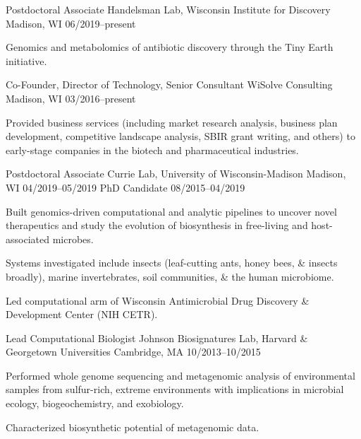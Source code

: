 

\begin{cventries}
  \cventry
    {Postdoctoral Associate} %
    {Handelsman Lab, Wisconsin Institute for Discovery} %
    {Madison, WI} %
    {06/2019--present} %
    {
      \begin{cvitems} %
        \item {Genomics and metabolomics of antibiotic discovery through the Tiny Earth initiative.}
      \end{cvitems}
    }
  \cventry
    {Co-Founder, Director of Technology, Senior Consultant} %
    {WiSolve Consulting} %
    {Madison, WI} %
    {03/2016--present} %
    {
      \begin{cvitems} %
        \item {Provided business services (including market research analysis, business plan development, competitive landscape analysis, SBIR grant writing, and others) to early-stage companies in the biotech and pharmaceutical industries.}
      \end{cvitems}
    }
  \vspace{0.4cm}
  \cventry
	{Postdoctoral Associate}
	{Currie Lab, University of Wisconsin-Madison}
	{Madison, WI}
	{04/2019--05/2019}
	{}
  \vspace{-0.4cm}	
  \cventry
    {PhD Candidate} %
    {} %
    {} %
    {08/2015--04/2019} %
    {
      \begin{cvitems} %
        \item {Built genomics-driven computational and analytic pipelines to uncover novel therapeutics and study the evolution of biosynthesis in free-living and host-associated microbes.}
        \item {Systems investigated include insects (leaf-cutting ants, honey bees, \& insects broadly), marine invertebrates, soil communities, \& the human microbiome.}
        \item {Led computational arm of Wisconsin Antimicrobial Drug Discovery \& Development Center (NIH CETR).}
      \end{cvitems}
    }
    
  \cventry
    {Lead Computational Biologist} %
    {Johnson Biosignatures Lab, Harvard \& Georgetown Universities} %
    {Cambridge, MA} %
    {10/2013--10/2015} %
    {
      \begin{cvitems} %
        \item {Performed whole genome sequencing and metagenomic analysis of environmental samples from sulfur-rich, extreme environments with implications in microbial ecology, biogeochemistry, and exobiology.}
        \item {Characterized biosynthetic potential of metagenomic data.}
      \end{cvitems} 
    }
    

\end{cventries}
